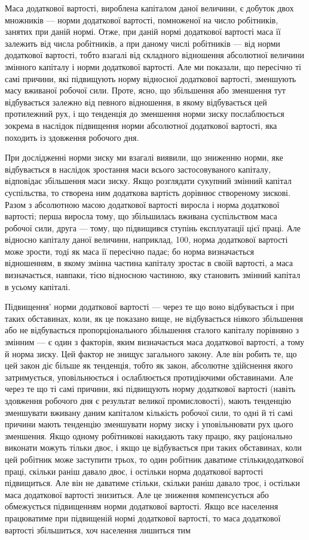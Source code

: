 Маса додаткової вартості, вироблена капіталом даної величини, є добуток двох множників — норми
додаткової вартості, помноженої на число робітників, занятих при даній нормі. Отже, при даній нормі
додаткової вартості маса її залежить від числа
робітників, а при даному числі робітників — від норми додаткової вартості, тобто взагалі від
складного відношення абсолютної
величини змінного капіталу і норми додаткової вартості. Але ми показали, що пересічно ті самі
причини, які підвищують норму відносної додаткової вартості, зменшують масу вживаної робочої сили.
Проте, ясно, що збільшення або зменшення тут відбувається залежно від певного відношення, в якому
відбувається цей протилежний рух, і що тенденція до зменшення норми зиску послаблюється зокрема в
наслідок підвищення норми абсолютної додаткової вартості, яка походить із здовження робочого дня.

При дослідженні норми зиску ми взагалі виявили, що зниженню норми, яке відбувається в наслідок
зростання маси всього застосовуваного капіталу, відповідає збільшення маси зиску. Якщо розглядати
сукупний змінний капітал суспільства, то
створена ним додаткова вартість дорівнює створеному зискові. Разом з абсолютною масою додаткової
вартості виросла і норма додаткової вартості; перша виросла тому, що збільшилась вживана
суспільством маса робочої сили, друга — тому, що підвищився ступінь експлуатації цієї праці. Але
відносно капіталу даної величини, наприклад, 100, норма додаткової вартості може зрости, тоді як
маса її пересічно падає; бо норма визначається відношенням, в якому змінна частина капіталу зростає
в своїй вартості, а маса визначається, навпаки, тією відносною частиною, яку становить змінний
капітал в усьому капіталі.

Підвищення' норми додаткової вартості — через те що воно відбувається і при таких обставинах, коли,
як це показано вище, не відбувається ніякого збільшення або не відбувається пропорціонального
збільшення сталого капіталу порівняно з змінним — є один з факторів, яким визначається маса
додаткової вартості, а тому й норма зиску. Цей фактор не знищує загального закону. Але він робить
те, що цей закон діє більше як тенденція, тобто як закон, абсолютне здійснення якого затримується,
уповільнюється і ослаблюється протидіючими обставинами. Але через те що ті самі причини, які
підвищують норму додаткової вартості (навіть здовження робочого дня є результат великої
промисловості), мають тенденцію зменшувати вживану даним капіталом кількість робочої сили, то одні й
ті самі причини мають тенденцію зменшувати норму зиску і уповільнювати рух цього зменшення. Якщо
одному робітникові накидають таку працю, яку раціонально виконати можуть тільки двоє, і якщо це
відбувається при таких обставинах, коли цей робітник може заступити трьох, то один робітник даватиме
стількидодаткової праці, скільки раніш давало двоє, і остільки норма додаткової вартості
підвищиться. Але він не даватиме стільки, скільки раніш давало троє, і остільки маса додаткової
вартості знизиться. Але це зниження компенсується або обмежується підвищенням норми додаткової
вартості. Якщо все населення працюватиме при підвищеній нормі додаткової вартості, то маса
додаткової вартості збільшиться, хоч населення лишиться тим
\parbreak{}  %
